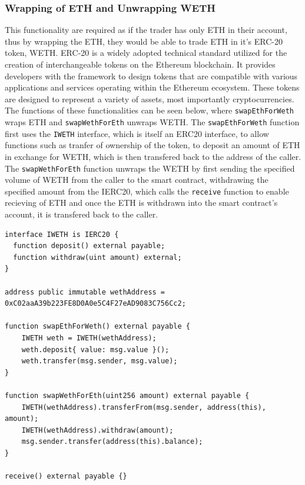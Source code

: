 \subsubsection{Wrapping of ETH and Unwrapping WETH}
This functionality are required as if the trader has only ETH in their account, thus by wrapping the ETH, they would be able to trade ETH in it's ERC-20 token, WETH. ERC-20 is a widely adopted technical standard utilized for the creation of interchangeable tokens on the Ethereum blockchain. It provides developers with the framework to design tokens that are compatible with various applications and services operating within the Ethereum ecosystem. These tokens are designed to represent a variety of assets, most importantly cryptocurrencies. The functions of these functionalities can be seen below, where \texttt{swapEthForWeth} wraps ETH and \texttt{swapWethForEth} unwraps WETH. The \texttt{swapEthForWeth} function first uses the \texttt{IWETH} interface, which is itself an ERC20 interface, to allow functions such as tranfer of ownership of the token, to deposit an amount of ETH in exchange for WETH, which is then transfered back to the address of the caller. The \texttt{swapWethForEth} function unwraps the WETH by first sending the specified volume of WETH from the caller to the smart contract, withdrawing the specified amount from the IERC20, which calls the \texttt{receive} function to enable recieving of ETH and once the ETH is withdrawn into the smart contract's account, it is transfered back to the caller.
\begin{lstlisting}[language=Solidity]
interface IWETH is IERC20 {
  function deposit() external payable;
  function withdraw(uint amount) external;
}

address public immutable wethAddress = 0xC02aaA39b223FE8D0A0e5C4F27eAD9083C756Cc2;

function swapEthForWeth() external payable {
    IWETH weth = IWETH(wethAddress);
    weth.deposit{ value: msg.value }();
    weth.transfer(msg.sender, msg.value);
}

function swapWethForEth(uint256 amount) external payable {
    IWETH(wethAddress).transferFrom(msg.sender, address(this), amount);
    IWETH(wethAddress).withdraw(amount);
    msg.sender.transfer(address(this).balance);
}

receive() external payable {}
\end{lstlisting}

